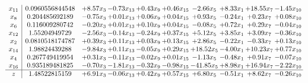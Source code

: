 \documentclass[9pt]{article}
\begin{document}
\[\begin{array}{c| c c@{\hskip 2pt} c@{\hskip 2pt} c@{\hskip 2pt} c@{\hskip 2pt} c@{\hskip 2pt} c@{\hskip 2pt} c@{\hskip 2pt} c@{\hskip 2pt} }
 x_{11}   &  0.0960556844548 & +  8.57 x_{3} & -0.73 x_{13} & +  0.43 x_{9} & +  0.46 x_{15} & -2.66 x_{5} & +  8.33 x_{1} & + 18.55 x_{7} & -1.45 x_{10}\\
 x_{8}   &  0.204485692189 & -0.75 x_{3} & +  0.01 x_{13} & +  0.06 x_{9} & +  0.04 x_{15} & +  0.93 x_{5} & -0.24 x_{1} & +  0.23 x_{7} & +  0.08 x_{10}\\
 x_{6}   &  0.116009280742 & -0.20 x_{3} & +  0.01 x_{13} & +  0.10 x_{9} & +  0.04 x_{15} & -0.08 x_{5} & +  0.72 x_{1} & +  0.29 x_{7} & -0.04 x_{10}\\
 x_{12}   &  1.55204949729 & -2.56 x_{3} & -0.14 x_{13} & -0.24 x_{9} & +  0.37 x_{15} & +  5.12 x_{5} & +  3.85 x_{1} & +  3.09 x_{7} & -0.36 x_{10}\\
 x_{2}   &  0.0810518174787 & +  0.39 x_{3} & +  0.11 x_{13} & +  0.03 x_{9} & +  0.13 x_{15} & +  2.86 x_{5} & -0.22 x_{1} & -0.33 x_{7} & +  0.13 x_{10}\\
 x_{14}   &  1.98824439288 & -9.84 x_{3} & +  0.11 x_{13} & -0.05 x_{9} & +  0.29 x_{15} & + 18.52 x_{5} & -4.00 x_{1} & + 10.23 x_{7} & +  0.77 x_{10}\\
 x_{4}   &  0.267749419954 & +  0.31 x_{3} & -0.11 x_{13} & -0.02 x_{9} & +  0.01 x_{15} & -1.13 x_{5} & -0.48 x_{1} & +  0.91 x_{7} & -0.07 x_{10}\\
 x_{16}   &  0.935189481825 & -0.70 x_{3} & -1.81 x_{13} & -0.32 x_{9} & -0.98 x_{15} & -41.85 x_{5} & +  8.98 x_{1} & + 16.94 x_{7} & -2.22 x_{10}\\
\hline
z    &  1.48522815159 & +  6.91 x_{3} & -0.06 x_{13} & +  0.42 x_{9} & +  0.57 x_{15} & +  6.80 x_{5} & -0.51 x_{1} & +  8.62 x_{7} & -0.26 x_{10}\\
\end{array}\]
\end{document}
